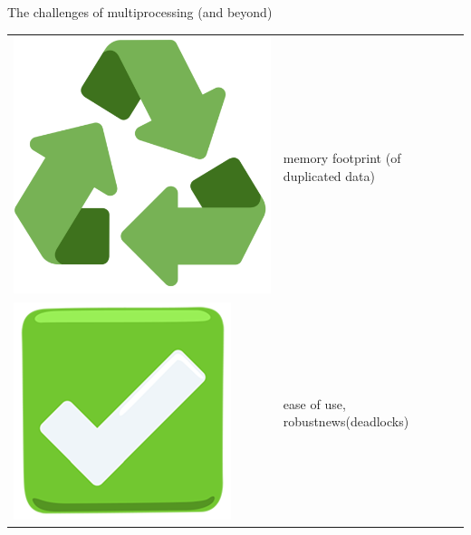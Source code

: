 \documentclass[13pt, usenames,dvipsnames]{beamer} %
\begin{document}
\begin{frame}[t]{The challenges of multiprocessing (and beyond)}
\begin{tabular}{m{0.5cm} m{10cm}}
                \includegraphics[width=\linewidth]{media/recyclable_emoji.png} & memory footprint (of duplicated data) \\
                \includegraphics[width=\linewidth]{media/green-tick-emoji.png} & ease of use, robustnews(deadlocks) \\
            \end{tabular}

    \end{frame}
    \begin{frame}[t]{}
        \vspace{10em}
    \end{frame}
\end{document}

